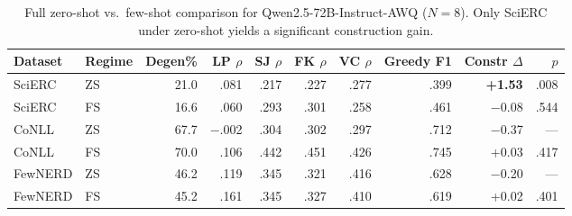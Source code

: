 \begin{table}[t]
\centering
\caption{Full zero-shot vs.\ few-shot comparison for Qwen2.5-72B-Instruct-AWQ ($N{=}8$). Only SciERC under zero-shot yields a significant construction gain.}
\label{tab:72b_zs_vs_fs}
\begin{tabular}{ll rrrrr rr r}
\toprule
Dataset & Regime & Degen\% & LP $\rho$ & SJ $\rho$ & FK $\rho$ & VC $\rho$ & Greedy F1 & Constr $\Delta$ & $p$ \\
\midrule
SciERC  & ZS & 21.0 & .081  & .217 & .227 & .277 & .399 & \textbf{+1.53} & .008 \\
SciERC  & FS & 16.6 & .060  & .293 & .301 & .258 & .461 & $-$0.08 & .544 \\
\midrule
CoNLL   & ZS & 67.7 & $-$.002 & .304 & .302 & .297 & .712 & $-$0.37 & --- \\
CoNLL   & FS & 70.0 & .106  & .442 & .451 & .426 & .745 & +0.03 & .417 \\
\midrule
FewNERD & ZS & 46.2 & .119  & .345 & .321 & .416 & .628 & $-$0.20 & --- \\
FewNERD & FS & 45.2 & .161  & .345 & .327 & .410 & .619 & +0.02 & .401 \\
\bottomrule
\end{tabular}
\end{table}
